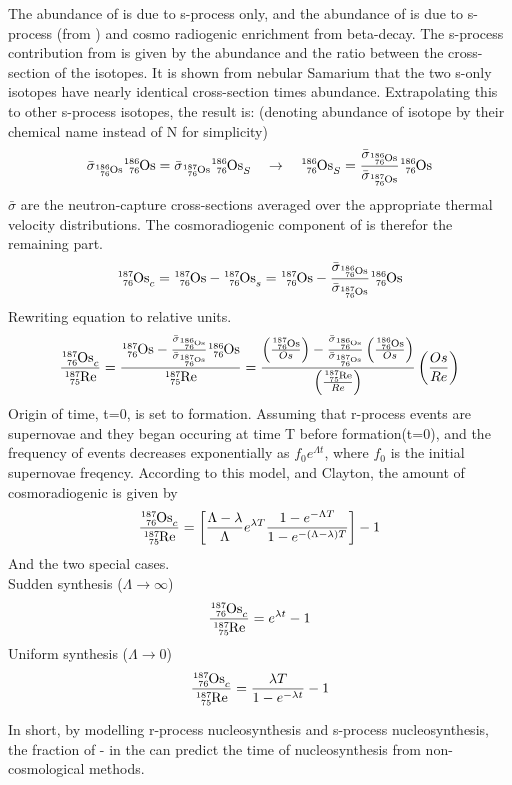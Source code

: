 The abundance of  is due to s-process only, and the abundance of  is due to s-process (from ) and cosmo radiogenic enrichment from  beta-decay.
The s-process contribution from  is given by the  abundance and the ratio between the cross-section of the isotopes. It is shown from nebular Samarium that the two s-only isotopes have nearly identical cross-section times abundance. Extrapolating this to other s-process isotopes, the result is:
(denoting abundance of isotope by their chemical name instead of N for simplicity)
\begin{equation}
  \bar{\sigma}_{\os{186}}{\os{186}} = \bar{\sigma}_{\os{187}}{\os{186}_S}
  \quad \rightarrow \quad
  {\os{186}_S} = \frac{\bar{\sigma}_{\os{186}}}{\bar{\sigma}_{\os{187}}}{\os{186}}
\end{equation}
$\bar{\sigma}$ are the neutron-capture cross-sections averaged over the appropriate thermal velocity distributions.
The cosmoradiogenic component of  is therefor the remaining part.
\begin{equation}
  \os{187}_c = \os{187} - \os{187}_s = \os{187} - \frac{\bar{\sigma}_{\os{186}}}{\bar{\sigma}_{\os{187}}}{\os{186}}
\end{equation}
Rewriting equation to relative units.
\begin{equation}
  \frac{\os{187}_c}{\re{187}} = \frac{\os{187} - \frac{\bar{\sigma}_{\os{186}}}{\bar{\sigma}_{\os{187}}}{\os{186}}}{\re{187}} =
  \frac{
    \left(\frac{\os{187}}{Os}\right) -
    \frac{\bar{\sigma}_{\os{186}}}{\bar{\sigma}_{\os{187}}}
    \left(\frac{\os{186}}{Os}\right)
  }{
    \left(\frac{\re{187}}{Re}\right)
  }
  \left(\frac{Os}{Re}\right)
\end{equation}
Origin of time, t=0, is set to \sos formation. Assuming that r-process events are supernovae and they began occuring at time T before \sos formation(t=0), and the frequency of events decreases exponentially as $f_0e^{\Lambda t}$, where $f_0$ is the initial supernovae freqency.
According to this model, and Clayton, the amount of cosmoradiogenic  is given by
\begin{equation}
  \frac{\os{187}_c}{\re{187}} = \left[
    \frac{\Lambda-\lambda}{\Lambda}
    e^{\lambda T}
    \frac{1-e^{-\Lambda T}}{1-e^{-(\Lambda-\lambda) T}}
    \right] - 1
\end{equation}
And the two special cases. \\
Sudden synthesis ($\Lambda\rightarrow\infty$)
\begin{equation}
  \frac{\os{187}_c}{\re{187}} = e^{\lambda t} - 1
\end{equation}
Uniform synthesis ($\Lambda\rightarrow 0$)
\begin{equation}
  \frac{\os{187}_c}{\re{187}} = \frac{\lambda T}{1-e^{-\lambda t}} - 1
\end{equation}


In short, by modelling r-process nucleosynthesis and s-process nucleosynthesis, the fraction of - in the \sos can predict the time of nucleosynthesis from non-cosmological methods.
